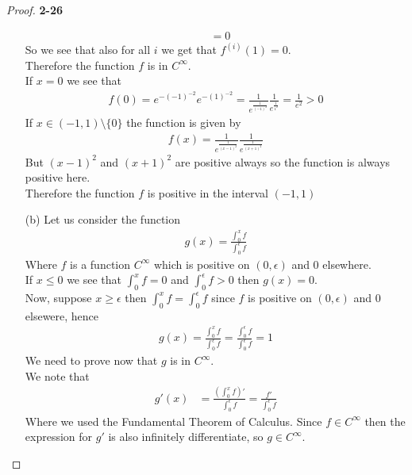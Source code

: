\documentclass[11pt]{article}
\theoremstyle{definition}
\begin{document}
\begin{proof}{\textbf{2-26}}
\begin{itemize}
\begin{align*}
    &= 0
\end{align*}
So we see that also for all $i$ we get that $f^{(i)}(1) = 0$.\\
Therefore the function $f$ is in $C^\infty$.
\\
If $x = 0$ we see that
\begin{align*}
    f(0) = e^{-(-1)^{-2}} e^{-(1)^{-2}}
    = \frac{1}{e^{\frac{1}{(-1)^2}}}\frac{1}{e^{\frac{1}{1^2}}}
    = \frac{1}{e^2} > 0
\end{align*}
If $x \in (-1, 1) \setminus \{0\}$ the function is given by
\begin{align*}
    f(x) = \frac{1}{e^{\frac{1}{(x-1)^2}}}\frac{1}{e^{\frac{1}{(x+1)^2}}}
\end{align*}
But $(x-1)^2$ and $(x + 1)^2$ are positive always so the function is always
positive here.
\\
Therefore the function $f$ is positive in the interval $(-1,1)$

\item [(b)] Let us consider the function
\begin{align*}
    g(x) = \frac{\int_0^x f}{\int_0^\epsilon f}
\end{align*}
Where $f$ is a function $C^\infty$ which is positive on $(0,\epsilon)$ and 0 
elsewhere.\\
If $x \leq 0$ we see that $\int_0^x f = 0$ and $\int_0^\epsilon f > 0$ then
$g(x) = 0$.\\
Now, suppose $x \geq \epsilon$ then $\int_0^x f = \int_0^\epsilon f$ since 
$f$ is positive on $(0,\epsilon)$ and 0 elsewere, hence
\begin{align*}
    g(x) = \frac{\int_0^x f}{\int_0^\epsilon f}
    = \frac{\int_0^\epsilon f}{\int_0^\epsilon f} = 1
\end{align*}
We need to prove now that $g$ is in $C^\infty$.\\
We note that
\begin{align*}
    g'(x) &= \frac{(\int_0^x f)'}{\int_0^\epsilon f}
    = \frac{f'}{\int_0^\epsilon f}
\end{align*}
Where we used the Fundamental Theorem of Calculus. Since $f \in C^\infty$ then
the expression for $g'$ is also infinitely differentiate, so $g \in C^\infty$.


\end{itemize}
\end{proof}
\end{document}
